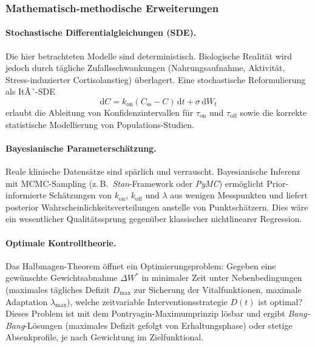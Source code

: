 ﻿\documentclass[12pt,a4paper]{article}
\theoremstyle{plain}
\theoremstyle{definition}
\theoremstyle{remark}
\begin{document}
\subsubsection{Mathematisch-methodische Erweiterungen}

\paragraph{Stochastische Differentialgleichungen (SDE).}
Die hier betrachteten Modelle sind deterministisch. Biologische Realität wird
jedoch durch tägliche Zufallsschwankungen (Nahrungsaufnahme, Aktivität,
Stress-induzierter Cortisolanstieg) überlagert. Eine stochastische
Reformulierung als ItÃ´-SDE
\begin{equation}
  \mathrm{d}C = k_\text{on}(C_\text{ss} - C)\,\mathrm{d}t + \sigma \, \mathrm{d}W_t
\end{equation}
erlaubt die Ableitung von Konfidenzintervallen für $\tau_\text{on}$ und
$\tau_\text{off}$ sowie die korrekte statistische Modellierung von
Populations-Studien.

\paragraph{Bayesianische Parameterschätzung.}
Reale klinische Datensätze sind spärlich und verrauscht.
Bayesianische Inferenz mit MCMC-Sampling (z.\,B.\
\textit{Stan}-Framework oder \textit{PyMC}) ermöglicht
Prior-informierte Schätzungen von $k_\text{on}$, $k_\text{off}$ und
$\lambda$ aus wenigen Messpunkten und liefert posterior Wahrscheinlichkeitsverteilungen
anstelle von Punktschätzern. Dies wäre ein wesentlicher Qualitätssprung
gegenüber klassischer nichtlinearer Regression.

\paragraph{Optimale Kontrolltheorie.}
Das Halbmagen-Theorem öffnet ein Optimierungsproblem: Gegeben eine
gewünschte Gewichtsabnahme $\Delta W^*$ in minimaler Zeit unter
Nebenbedingungen (maximales tägliches Defizit $D_\text{max}$ zur Sicherung
der Vitalfunktionen, maximale Adaptation $\lambda_\text{max}$), welche
zeitvariable Interventionsstrategie $D(t)$ ist optimal? Dieses Problem ist
mit dem Pontryagin-Maximumprinzip lösbar und ergibt \emph{Bang-Bang}-Lösungen
(maximales Defizit gefolgt von Erhaltungsphase) oder stetige Absenkprofile,
je nach Gewichtung im Zielfunktional.
\end{document}
